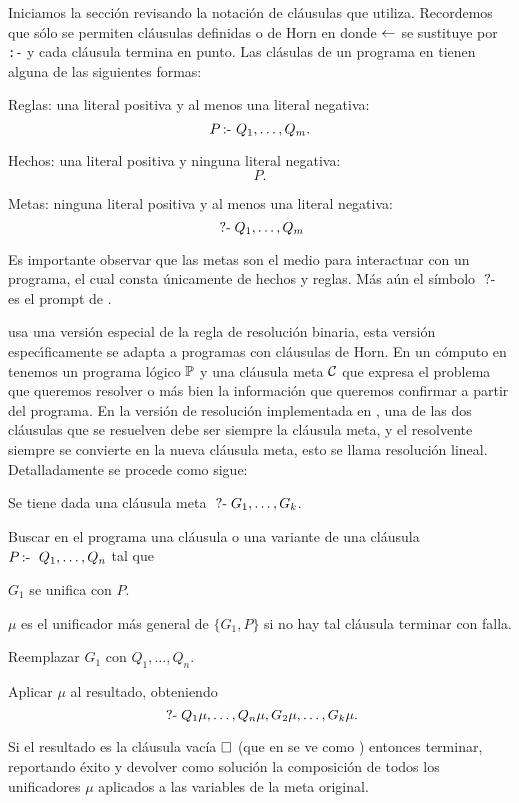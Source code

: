 \documentclass[11pt,letterpaper]{article}
\begin{document}
Iniciamos la secci\'on revisando la notaci\'on de cl\'ausulas que {\pl}
utiliza. Recordemos que s\'olo se permiten cl\'ausulas definidas o de Horn en 
donde $\pmi$ se sustituye por \verb!:-! y cada cl\'ausula termina en punto.
Las cl\'asulas de un programa en {\pl} tienen alguna de las siguientes formas:
\bi
\item Reglas: una literal positiva y al menos una literal negativa:
  $$ P\impp Q_1,\ldots,Q_m. $$
\item Hechos: una literal positiva y ninguna literal negativa:
  $$ P.$$ 
\item Metas: ninguna literal positiva y al menos una literal negativa:
  $$\meta Q_1,\ldots,Q_m$$ 
\ei

Es importante observar que las metas son el medio para interactuar con
un programa, el cual consta \'unicamente de hechos y reglas. M\'as a\'un el
s\'imbolo $\meta$ es el prompt de {\pl}.

\bigskip


{\pl}  usa una versi\'on especial de la regla de resoluci\'on binaria, esta
versi\'on espec\'{\i}ficamente se adapta a programas con cl\'ausulas de
Horn. En un c\'omputo en {\pl} tenemos un programa l\'ogico $\P$ y una
cl\'ausula meta $\C$ que expresa el problema que queremos resolver o m\'as 
bien la informaci\'on que queremos confirmar a partir del programa. 
En la versi\'on de resoluci\'on implementada en {\pl}, una de las dos 
cl\'ausulas que se resuelven debe ser siempre la cl\'ausula meta, y el 
resolvente siempre se convierte en la nueva cl\'ausula meta, esto se llama 
resoluci\'on lineal.
Detalladamente se procede como sigue:
\be
\item Se tiene dada una cl\'ausula meta $\meta G_1,\ldots, G_k$.
\item Buscar en el programa una cl\'ausula o una variante de una cl\'ausula
$P\impp\; Q_1,\ldots, Q_n$ tal que 
\bi
\item $G_1$ se unifica con $P$.
\item $\mu$ es el unificador m\'as general de $\{G_1,P\}$
\ei
si no hay tal cl\'ausula terminar con falla.
\item Reemplazar $G_1$ con $Q_1,\ldots, Q_n$.
\item Aplicar $\mu$ al resultado, obteniendo
$$ \meta Q_1\mu,\ldots,Q_n\mu,G_2\mu,\ldots,G_k\mu. $$
\item Si el resultado es la cl\'ausula vac\'ia $\cv$ (que en {\pl} se ve 
  como \meta) entonces terminar, reportando \'exito y devolver como soluci\'on 
la   composici\'on de todos los unificadores $\mu$ aplicados a las variables de 
la   meta original.
\ee   
\end{document}
